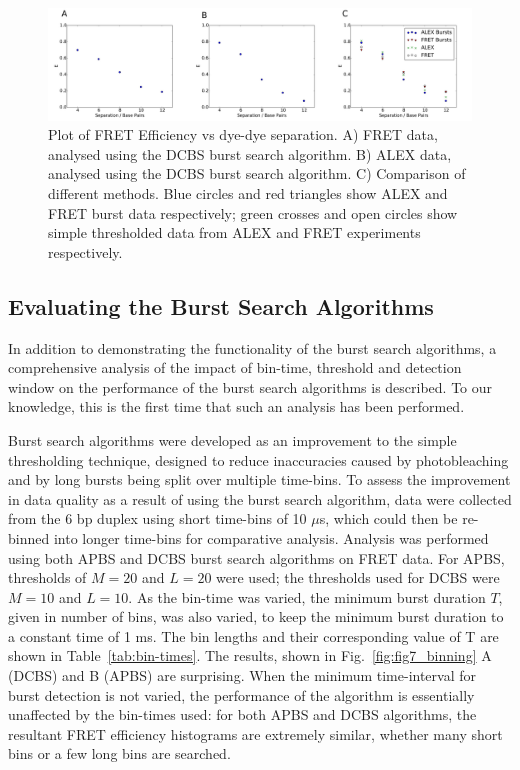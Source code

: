\begin{figure}[!ht]
   \begin{center}
      \includegraphics*[clip=true, width=6in]{pyFRET/Bp_vs_E.pdf}
      \caption{Plot of FRET Efficiency vs dye-dye separation. A) FRET data, analysed using the DCBS burst search algorithm. B) ALEX data, analysed using the DCBS burst search algorithm. C) Comparison of different methods. Blue circles and red triangles show ALEX and FRET burst data respectively; green crosses and open circles show simple thresholded data from ALEX and FRET experiments respectively.}
      \label{fig:fig6_Eplots}
   \end{center}
\end{figure}

\subsection{Evaluating the Burst Search Algorithms}
In addition to demonstrating the functionality of the burst search algorithms, a comprehensive analysis of the impact of bin-time, threshold and detection window on the performance of the burst search algorithms is described. To our knowledge, this is the first time that such an analysis has been performed.

Burst search algorithms were developed as an improvement to the simple thresholding technique, designed to reduce inaccuracies caused by photobleaching and by long bursts being split over multiple time-bins. To assess the improvement in data quality as a result of using the burst search algorithm, data were collected from the 6 bp duplex using short time-bins of 10 $\mu$s, which could then be re-binned into longer time-bins for comparative analysis. Analysis was performed using both APBS and DCBS burst search algorithms on FRET data. For APBS, thresholds of $M=20$ and $L=20$ were used; the thresholds used for DCBS were $M = 10$ and $L = 10$. As the bin-time was varied, the minimum burst duration $T$, given in number of bins, was also varied, to keep the minimum burst duration to a constant time of 1 ms. The bin lengths and their corresponding value of T are shown in Table~\ref{tab:bin-times}. The results, shown in Fig.~\ref{fig:fig7_binning} A (DCBS) and B (APBS) are surprising. When the minimum time-interval for burst detection is not varied, the performance of the algorithm is essentially unaffected by the bin-times used: for both APBS and DCBS algorithms, the resultant FRET efficiency histograms are extremely similar, whether many short bins or a few long bins are searched.


